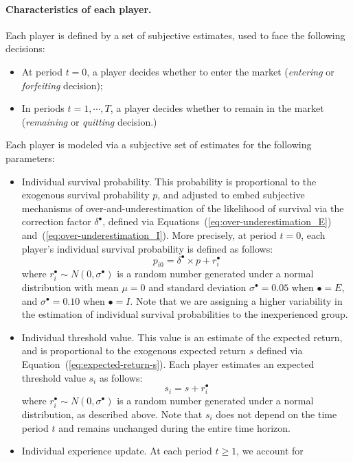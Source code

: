 \documentclass{article}
\begin{document}
\paragraph{Characteristics of each player.} Each player is defined by a set of
subjective estimates, used to face the following decisions:
\begin{itemize}
\item At period $t=0$, a player decides whether to enter the market
(\textit{entering} or \textit{forfeiting} decision);
\item In periods $t=1,\cdots,T$, a player decides whether to remain in the
market (\textit{remaining} or \textit{quitting} decision.)
\end{itemize}
Each player is modeled via a subjective set of estimates for the following parameters:
\begin{itemize}
\item Individual survival probability. This probability is proportional
to the exogenous survival probability $p$, and adjusted to embed subjective
mechanisms of over-and-underestimation of the likelihood of survival via the
correction factor $\delta^\bullet$, defined via
Equations~(\ref{eq:over-underestimation_E})
and~(\ref{eq:over-underestimation_I}). More precisely, at period $t=0$, each
player's individual survival probability is defined as follows:
\begin{equation}
p_{i0}= \delta^\bullet \times p + r_i^\bullet
\label{eq:pi}
\end{equation}
where $r_i^\bullet \sim N(0,\sigma^\bullet)$ is a random number generated under a
normal distribution with mean $\mu=0$ and standard deviation
$\sigma^\bullet=0.05$ when $\bullet = E$, and $\sigma^\bullet=0.10$ when
$\bullet = I$. Note that we are assigning a higher variability in the
estimation of individual survival probabilities to the inexperienced group.
\item Individual threshold value. This value is an estimate of the expected
return, and is proportional to the exogenous expected return $s$ defined via
Equation~(\ref{eq:expected-return-s}). Each player estimates an expected
threshold value $s_i$ as follows:
\begin{equation}
s_i= s + r_i^\bullet
\label{eq:si}
\end{equation}
where $r_i^\bullet \sim N(0, \sigma^\bullet)$ is a random number generated under
a normal distribution, as described above. Note that $s_i$ does not depend on
the time period $t$ and remains unchanged during the entire time horizon.
\item Individual experience update. At each period $t \geq 1$, we account for

\end{itemize}
\end{document}
